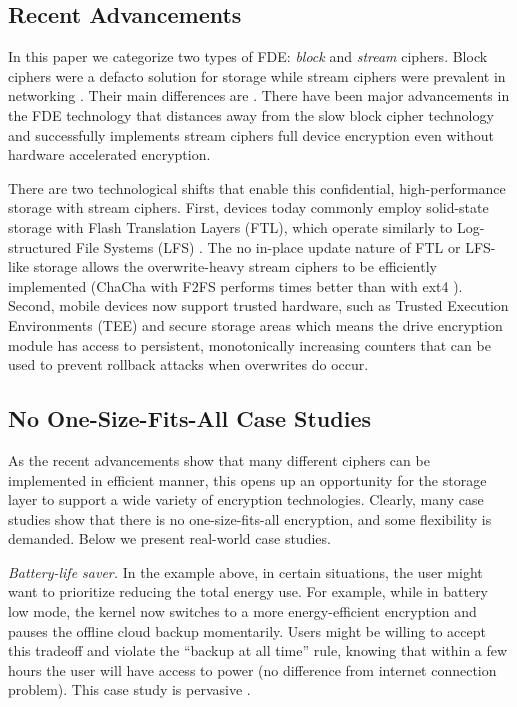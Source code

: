 \subsection{Recent Advancements}

In this paper we categorize two types of FDE: {\em block} and {\em stream}
ciphers. Block ciphers were a defacto solution for storage while stream ciphers
were prevalent in networking . Their main differences are . There have been major advancements in the FDE
technology that distances away from the slow block cipher technology and
successfully implements stream ciphers full device encryption \cite{Adiantum,
StrongBox} even without hardware accelerated encryption.


There are two technological shifts that enable this confidential,
high-performance storage with stream ciphers. First, devices today commonly
employ solid-state storage with Flash Translation Layers (FTL), which operate
similarly to Log-structured File Systems (LFS) \cite{LFS, F2FS, NILFS}. The no
in-place update nature of FTL or LFS-like storage allows the overwrite-heavy
stream ciphers to be efficiently implemented (\eg ChaCha with F2FS performs \xxx
times better than with ext4 \cite{StrongBox}). Second, mobile devices now
support trusted hardware, such as Trusted Execution Environments (TEE)
\cite{TrustZone, TEE} and secure storage areas \cite{eMMC-standard} which means
the drive encryption module has access to persistent, monotonically increasing
counters that can be used to prevent rollback attacks when overwrites do occur.


\subsection{No One-Size-Fits-All Case Studies}

As the recent advancements show that many different ciphers can be implemented
in efficient manner, this opens up an opportunity for the storage layer to
support a wide variety of encryption technologies. Clearly, many case studies
show that there is no one-size-fits-all encryption, and some flexibility is
demanded. Below we present \numCases real-world case studies.

{\em Battery-life saver.} In the example above, in certain situations, the user
might want to prioritize reducing the total energy use. For example, while in
battery low mode, the kernel now switches to a more energy-efficient encryption
and pauses the offline cloud backup momentarily. Users might be willing to
accept this tradeoff and violate the ``backup at all time'' rule, knowing that
within a few hours the user will have access to power (no difference from
internet connection problem). This case study is pervasive \cite{hackernews-???,
many-more??}.

